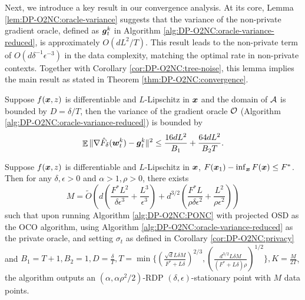 Next, we introduce a key result in our convergence analysis. At its core, Lemma \ref{lem:DP-O2NC:oracle-variance} suggests that the variance of the non-private gradient oracle, defined as ${\boldsymbol{g}}_t^k$ in Algorithm \ref{alg:DP-O2NC:oracle-variance-reduced}, is approximately $O(dL^2/T)$. This result leads to the non-private term of $O(d\delta^{-1}\epsilon^{-3})$ in the data complexity, matching the optimal rate in non-private contexts. Together with Corollary \ref{cor:DP-O2NC:tree-noise}, this lemma implies the main result as stated in Theorem \ref{thm:DP-O2NC:convergence}.

\begin{lemma}
\label{lem:DP-O2NC:oracle-variance}
Suppose $f({\boldsymbol{x}},z)$ is differentiable and $L$-Lipschitz in ${\boldsymbol{x}}$ and the domain of ${\cal A}$ is bounded by $D={\delta}/{T}$, then the variance of the gradient oracle ${\cal O}$ (Algorithm \ref{alg:DP-O2NC:oracle-variance-reduced}) is bounded by
\begin{equation*}
    \mathop{\mathbb{E}}\| \nabla\hat F_\delta({\boldsymbol{w}}_t^k) - {\boldsymbol{g}}_t^k \|^2 \le \frac{16dL^2}{B_1} + \frac{64dL^2}{B_2T}.
\end{equation*}
\end{lemma}


\begin{theorem}
\label{thm:DP-O2NC:convergence}
Suppose $f({\boldsymbol{x}},z)$ is differentiable and $L$-Lipschitz in ${\boldsymbol{x}}$, $F({\boldsymbol{x}}_1)-\inf_{\boldsymbol{x}} F({\boldsymbol{x}}) \le F^*$. Then for any $\delta,\epsilon>0$ and $\alpha>1,\rho>0$, there exists 
\begin{equation*}
    M = \tilde O\left( d\left(\frac{F^*L^2}{\delta\epsilon^3} + \frac{L^3}{\epsilon^3}\right) + d^{3/2}\left(\frac{F^*L}{\rho\delta\epsilon^2} + \frac{L^2}{\rho\epsilon^2}\right) \right)
\end{equation*}
such that upon running Algorithm \ref{alg:DP-O2NC:PONC} with projected OSD as the OCO algorithm, using Algorithm \ref{alg:DP-O2NC:oracle-variance-reduced} as the private oracle, and setting $\sigma_t$ as defined in Corollary \ref{cor:DP-O2NC:privacy} and $B_1=T+1, B_2=1, D=\frac{\delta}{T}, T=\min\{(\frac{\sqrt{d}L\delta M}{F^*+L\delta})^{2/3}, (\frac{d^{3/2}L\delta M}{(F^*+L\delta)\rho})^{1/2}\}, K=\frac{M}{2T}$, the algorithm outputs an $(\alpha,\alpha\rho^2/2)$-RDP $(\delta,\epsilon)$-stationary point with $M$ data points. 
\end{theorem}

